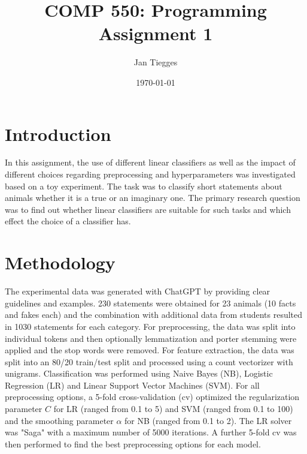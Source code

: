 \documentclass[12pt]{article}
\title{\textbf{COMP 550: Programming Assignment 1}}
\date{\today}
\author{Jan Tiegges}
\begin{document}
\maketitle

\section{Introduction}
In this assignment, the use of different linear classifiers as well as the impact of different choices regarding preprocessing and hyperparameters was investigated based on a toy experiment. The task was to classify short statements about animals whether it is a true or an imaginary one. The primary research question was to find out whether linear classifiers are suitable for such tasks and which effect the choice of a classifier has.


\section{Methodology}

The experimental data was generated with ChatGPT by providing clear guidelines and examples. 230 statements were obtained for 23 animals (10 facts and fakes each) and the combination with additional data from students resulted in 1030 statements for each category. For preprocessing, the data was split into individual tokens and then optionally lemmatization and porter stemming were applied and the stop words were removed. For feature extraction, the data was split into an 80/20 train/test split and processed using a count vectorizer with unigrams. Classification was performed using Naive Bayes (NB), Logistic Regression (LR) and Linear Support Vector Machines (SVM). For all preprocessing options, a 5-fold cross-validation (cv) optimized the regularization parameter $C$ for LR (ranged from 0.1 to 5) and SVM (ranged from 0.1 to 100) and the smoothing parameter $\alpha$ for NB (ranged from 0.1 to 2). The LR solver was "Saga" with a maximum number of 5000 iterations. A further 5-fold cv was then performed to find the best preprocessing options for each model. 
\end{document}
